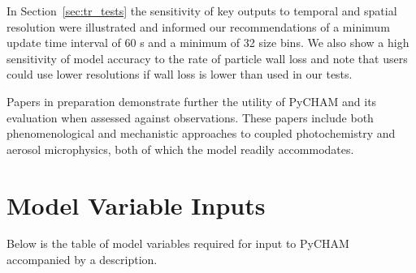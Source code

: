 \documentclass[gmd, manuscript]{copernicus}
\begin{document}
In Section~\ref{sec:tr_tests} the sensitivity of key outputs to temporal and spatial resolution were illustrated and informed our recommendations of a minimum update time interval of 60 s and a minimum of 32 size bins.  We also show a high sensitivity of model accuracy to the rate of particle wall loss and note that users could use lower resolutions if wall loss is lower than used in our tests.

Papers in preparation demonstrate further the utility of PyCHAM and its evaluation when assessed against observations.  These papers include both phenomenological and mechanistic approaches to coupled photochemistry and aerosol microphysics, both of which the model readily accommodates.



\appendix
\section{Model Variable Inputs}\label{sec:appA}    %

Below is the table of model variables required for input to PyCHAM accompanied by a description. 
\end{document}
